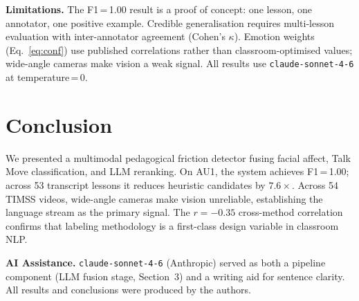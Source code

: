 \documentclass[10pt,twocolumn,letterpaper]{article}
\begin{document}
\textbf{Limitations.}
The F1\,=\,1.00 result is a proof of concept: one lesson, one annotator,
one positive example.  Credible generalisation requires multi-lesson
evaluation with inter-annotator agreement (Cohen's $\kappa$).
Emotion weights (Eq.~\ref{eq:conf}) use published correlations rather than
classroom-optimised values; wide-angle cameras make vision a weak signal.
All results use \texttt{claude-sonnet-4-6} at temperature\,=\,0.

\section{Conclusion}

We presented a multimodal pedagogical friction detector fusing facial
affect, Talk Move classification, and LLM reranking.  On AU1, the
system achieves F1\,=\,1.00; across 53 transcript lessons it reduces
heuristic candidates by $7.6\times$.  Across 54 TIMSS videos,
wide-angle cameras make vision unreliable, establishing the language
stream as the primary signal.  The $r{=}{-}0.35$ cross-method
correlation confirms that labeling methodology is a first-class
design variable in classroom NLP.

{\small


}

\bigskip\noindent\textbf{AI Assistance.}
\texttt{claude-sonnet-4-6} (Anthropic) served as both a pipeline
component (LLM fusion stage, Section~3) and a writing aid for
sentence clarity.  All results and conclusions were produced by
the authors.
\end{document}
